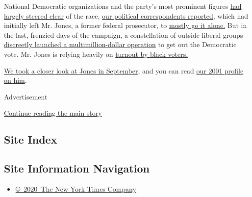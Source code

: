 National Democratic organizations and the party's most prominent figures
\href{https://www.nytimes3xbfgragh.onion/2017/11/14/us/politics/alabama-doug-jones-roy-moore-democrats.html}{had
largely steered clear} of the race,
\href{https://www.nytimes3xbfgragh.onion/2017/11/14/us/politics/alabama-doug-jones-roy-moore-democrats.html}{our
political correspondents reported}, which had initially left Mr. Jones,
a former federal prosecutor, to
\href{https://www.nytimes3xbfgragh.onion/2017/11/19/us/jones-alabama-democrats.html}{mostly
go it
alone}\href{https://www.nytimes3xbfgragh.onion/2017/11/29/us/doug-jones-roy-moore-black-voters.html}{.}
But in the last, frenzied days of the campaign, a constellation of
outside liberal groups
\href{https://www.nytimes3xbfgragh.onion/2017/12/10/us/politics/richard-shelby-roy-moore.html}{discreetly
launched a multimillion-dollar operation} to get out the Democratic
vote. Mr. Jones is relying heavily on
\href{https://www.nytimes3xbfgragh.onion/2017/11/29/us/doug-jones-roy-moore-black-voters.html}{turnout
by black voters.}

\href{https://www.nytimes3xbfgragh.onion/2017/10/02/us/politics/doug-jones-democrats-alabama-senate-roy-moore.html}{We
took a closer look at Jones in September}, and you can read
\href{http://www.nytimes3xbfgragh.onion/2001/05/05/us/public-lives-an-alabama-prosecutor-confronts-the-burden-of-history.html}{our
2001 profile on him}.

Advertisement

\protect\hyperlink{after-bottom}{Continue reading the main story}

\hypertarget{site-index}{%
\subsection{Site Index}\label{site-index}}

\hypertarget{site-information-navigation}{%
\subsection{Site Information
Navigation}\label{site-information-navigation}}

\begin{itemize}
\tightlist
\item
  \href{https://help.nytimes3xbfgragh.onion/hc/en-us/articles/115014792127-Copyright-notice}{©~2020~The
  New York Times Company}
\end{itemize}

